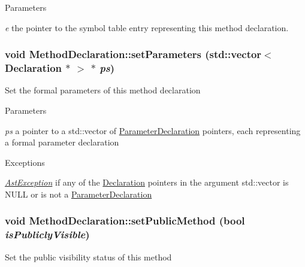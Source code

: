 \begin{DoxyParams}{Parameters}
\item[{\em e}]the pointer to the symbol table entry representing this method declaration. \end{DoxyParams}
\hypertarget{classMethodDeclaration_a82bce812810c881e6f1dca61b5b631ff}{
\subsubsection[{setParameters}]{\setlength{\rightskip}{0pt plus 5cm}void MethodDeclaration::setParameters (std::vector$<$ {\bf Declaration} $\ast$ $>$ $\ast$ {\em ps})}}
\label{classMethodDeclaration_a82bce812810c881e6f1dca61b5b631ff}
Set the formal parameters of this method declaration


\begin{DoxyParams}{Parameters}
\item[{\em ps}]a pointer to a std::vector of \hyperlink{classParameterDeclaration}{ParameterDeclaration} pointers, each representing a formal parameter declaration \end{DoxyParams}

\begin{DoxyExceptions}{Exceptions}
\item[{\em \hyperlink{classAstException}{AstException}}]if any of the \hyperlink{classDeclaration}{Declaration} pointers in the argument std::vector is NULL or is not a \hyperlink{classParameterDeclaration}{ParameterDeclaration} \end{DoxyExceptions}
\hypertarget{classMethodDeclaration_ad22630f0023935de4f76b0f399633ede}{
\subsubsection[{setPublicMethod}]{\setlength{\rightskip}{0pt plus 5cm}void MethodDeclaration::setPublicMethod (bool {\em isPubliclyVisible})}}
\label{classMethodDeclaration_ad22630f0023935de4f76b0f399633ede}
Set the public visibility status of this method


